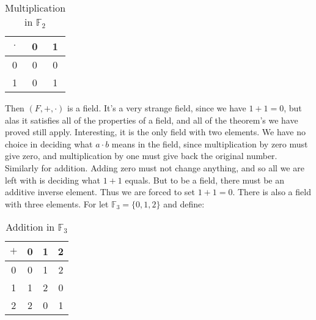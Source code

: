             \hfill
            \begin{minipage}[b]{0.49\textwidth}
                \begin{table}[H]
                    \centering
                    \captionsetup{type=table}
                    \begin{tabular}{c|cc}
                        $\cdot$&0&1\\
                        \hline
                        0&0&0\\
                        1&0&1
                    \end{tabular}
                    \caption{Multiplication in $\mathbb{F}_{2}$}
                    \label{tab:Real_Analysis_Mult_in_F_2_Field}
                \end{table}
            \end{minipage}
            Then $(F,+,\cdot)$ is a field. It's a very strange field,
            since we have $1+1=0$, but alas it satisfies all of the
            properties of a field, and all of the theorem's we have
            proved still apply. Interesting, it is the only field
            with two elements. We have no choice in deciding what
            $a\cdot{b}$ means in the field, since multiplication by
            zero must give zero, and multiplication by one must give
            back the original number. Similarly for addition.
            Adding zero must not change anything, and so all
            we are left with is deciding what $1+1$ equals. But
            to be a field, there must be an additive inverse
            element. Thus we are forced to set $1+1=0$. There is
            also a field with three elements. For let
            $\mathbb{F}_{3}=\{0,1,2\}$ and define:
            \par\hfill\par
            \begin{minipage}[b]{0.49\textwidth}
                \centering
                \begin{table}[H]
                    \centering
                    \captionsetup{type=table}
                    \begin{tabular}{c|ccc}
                        $+$&0&1&2\\
                        \hline
                        0&0&1&2\\
                        1&1&2&0\\
                        2&2&0&1
                    \end{tabular}
                    \caption{Addition in $\mathbb{F}_{3}$}
                    \label{tab:Real_Analysis_Add_in_F_3_Field}
                \end{table}
            \end{minipage}
